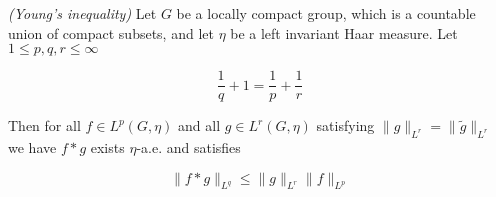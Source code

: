\vspace{2mm}

\begin{mdframed}
	\begin{theorem}\emph{(Young's inequality)}
		Let $G$ be a locally compact group, which is a countable union of compact subsets, and let $\eta$ be a left invariant Haar measure. Let $1 \leqslant p,q,r \leqslant \infty$

		\begin{equation}
			\frac{1}{q} + 1 = \frac{1}{p} + \frac{1}{r}
		\end{equation}

		Then for all $f \in L^p(G,\eta)$ and all $g \in L^r(G,\eta)$ satisfying $\|g\|_{L^r} = \|\tilde{g}\|_{L^r}$ we have $f \ast g$ exists $\eta$-a.e. and satisfies

		\begin{equation}
			\|f \ast g\|_{L^q} \leqslant \|g\|_{L^r}\|f\|_{L^p}
		\end{equation}
	\end{theorem}
\end{mdframed}

